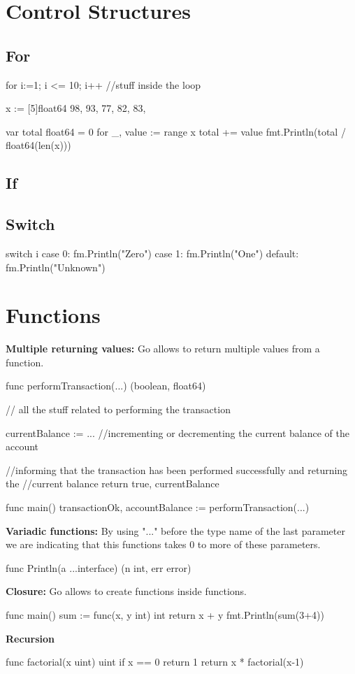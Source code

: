 \documentclass[twoside,a4paper,english]{report}
\begin{document}
\chapter{Control Structures}
\section{For}
\begin{go}
for i:=1; i <= 10; i++ {
  //stuff inside the loop
}

x := [5]float64{
  98,
  93,
  77,
  82,
  83,
}

var total float64 = 0
for _, value := range x {
  total += value
}
fmt.Println(total / float64(len(x)))
\end{go}
\section{If}
\section{Switch}
\begin{go}
switch i {
  case 0: fm.Println("Zero")
  case 1: fm.Println("One")
  default: fm.Println("Unknown")
} 
\end{go}
\chapter{Functions}
\textbf{Multiple returning values:} Go allows to return multiple values from a function.
\begin{go}
func performTransaction(...) (boolean, float64) {
  // all the stuff related to performing the transaction

  currentBalance := ... //incrementing or decrementing the current balance of the account

  //informing that the transaction has been performed successfully and returning the //current balance
  return true, currentBalance
}

func main() {
  transactionOk, accountBalance := performTransaction(...)
}
\end{go}
\textbf{Variadic functions:} By using "..." before the type name of the last parameter we are indicating that this functions takes 0 to more of these parameters.
\begin{go}
func Println(a ...interface{}) (n int, err error)
\end{go}
\textbf{Closure:} Go allows to create functions inside functions.
\begin{go}
func main() {
  sum := func(x, y int) int {
    return x + y
  }
  fmt.Println(sum(3+4))
}
\end{go}
\textbf{Recursion}
\begin{go}
func factorial(x uint) uint {
  if x == 0 {
    return 1
  }
  return x * factorial(x-1)
}   
\end{go}
\end{document}
